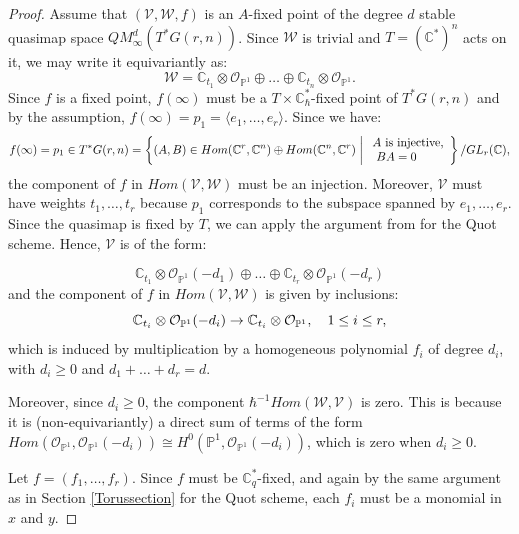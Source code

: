 \documentclass{amsart}
\begin{document}
\begin{proof}
    
 Assume that $(\mathcal{V},\mathcal{W},f)$ 
is an $A$-fixed point of the degree $d$ stable quasimap space $QM_{\infty}^d(T^*G(r,n))$. Since $\mathcal{W}$ is trivial and $T=(\mathbb{C}^*)^n$ acts on it, we may write it equivariantly as:
\begin{equation}\label{first}
\mathcal{W}=\mathbb{C}_{t_1}\otimes\mathcal{O}_{\mathbb{P}^1} \oplus \dots \oplus \mathbb{C}_{t_n}\otimes\mathcal{O}_{\mathbb{P}^1}.
\end{equation}
Since $f$ is a fixed point, $f(\infty)$ must be a $T \times \mathbb{C}^*_{\hbar}$-fixed point of $T^*G(r,n)$ and by the assumption, $f(\infty) = p_1 = \langle e_1,\dots,e_r \rangle$. Since we have:
\[
f(\infty) = p_1 \in T^*G(r,n)=\left\{
(A,B) \in Hom(\mathbb{C}^r,\mathbb{C}^n) \oplus Hom(\mathbb{C}^n,\mathbb{C}^r)
 \biggm| \begin{array}{l}
A \textrm{ is injective,}\\
 \textrm{ $BA=0$}
\end{array}
\right\}/GL_r(\mathbb{C}),
\]
the component of $f$ in $Hom(\mathcal{V},\mathcal{W})$ must be an injection. Moreover, $\mathcal{V}$ must have weights $t_1,\dots,t_r$ because $p_1$ corresponds to the subspace spanned by $e_1,\dots,e_r$. Since the quasimap is fixed by $T$, we can apply the argument from  for the Quot scheme. Hence, $\mathcal{V}$ is of the form:


\[
 \mathbb{C}_{t_1}\otimes\mathcal{O}_{\mathbb{P}^1}(-d_1) \oplus \dots \oplus \mathbb{C}_{t_r}\otimes\mathcal{O}_{\mathbb{P}^1}(-d_r) 
\]
and the component of $f$ in $Hom(\mathcal{V},\mathcal{W})$ is given by inclusions:
\begin{equation}\label{given maps}
\mathbb{C}_{t_i}\otimes\mathcal{O}_{\mathbb{P}^1}(-d_i) \to \mathbb{C}_{t_i}\otimes\mathcal{O}_{\mathbb{P}^1} \/, \quad 1 \leq i \leq r,
\end{equation}
which is induced by multiplication by a homogeneous polynomial $f_i$ of degree $d_i$, with $d_i \ge 0$ and $d_1+\dots+d_r=d$.

Moreover, since $d_i \geq 0$, the component $\hbar^{-1}Hom(\mathcal{W},\mathcal{V})$ is zero. This is because it is (non-equivariantly) a direct sum of terms of the form $Hom(\mathcal{O}_{\mathbb{P}^1} , \mathcal{O}_{\mathbb{P}^1}(-d_i)) \cong H^0(\mathbb{P}^1,\mathcal{O}_{\mathbb{P}^1}(-d_i))$, which is zero when $d_i \geq 0$.

Let $f=(f_1,\dots,f_r)$. Since $f$ must be $\mathbb{C}_q^*$-fixed, and again by the same argument as in Section \eqref{Torussection} for the Quot scheme, each $f_{i}$ must be a monomial in $x$ and $y$. 


\end{proof}
\end{document}
